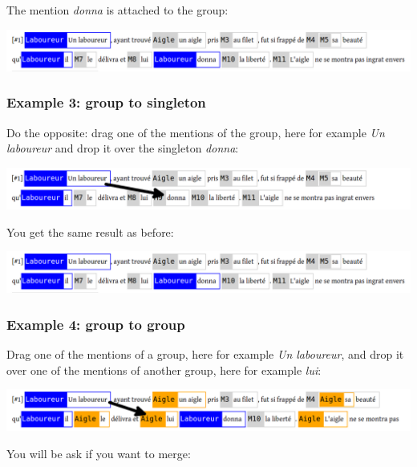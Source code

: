 \documentclass[12pt]{article}
\begin{document}
The mention \emph{donna} is attached to the group:\nopagebreak

\includegraphics[width=17cm]{imgs/dd_example_02_after.png}

 \subsubsection{Example 3: group to singleton}

Do the opposite: drag one of the mentions of the group, here for example
\emph{Un laboureur} and drop it over the singleton \emph{donna}:\nopagebreak

\includegraphics[width=17cm]{imgs/dd_example_02_before.png}

You get the same result as before:\nopagebreak

\includegraphics[width=17cm]{imgs/dd_example_02_after.png}

 \subsubsection{Example 4: group to group}

\label{sec:merging-example}

Drag one of the mentions of a group, here for example \emph{Un laboureur},
and drop it over one of the mentions of another group, here for example 
\emph{lui}:\nopagebreak

\includegraphics[width=17cm]{imgs/dd_example_03_before.png}

You will be ask if you want to merge:\nopagebreak
\end{document}
